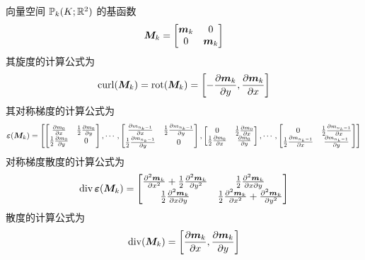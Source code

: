 \documentclass{article}
\begin{document}
向量空间 ${\mathbb P}_k(K;{\mathbb R}^2)$ 的基函数
$$
{\boldsymbol M}_k = \begin{bmatrix}
    {\boldsymbol m}_k & 0 \\ 0 & {\boldsymbol m}_k
\end{bmatrix}
$$
其旋度的计算公式为
$$
\operatorname{curl}({\boldsymbol M}_k) = \operatorname{rot}({\boldsymbol M}_k) = 
\left[
    -\frac{\partial {\boldsymbol m}_k}{\partial y}, \frac{\partial {\boldsymbol m}_k}{\partial x}
\right]
$$
其对称梯度的计算公式为
$$
{\bm \varepsilon}({\boldsymbol M}_k) = 
\left[
    \begin{bmatrix}
        {\partial m_0 \over \partial x} & 
        \frac{1}{2}{\partial m_0 \over \partial y} \\
        \frac{1}{2}{\partial m_0 \over \partial y} & 0\\
    \end{bmatrix}
    , \cdots, 
    \begin{bmatrix}
        {\partial m_{n_k-1} \over \partial x} & 
        \frac{1}{2}{\partial m_{n_k-1} \over \partial y} \\
        \frac{1}{2}{\partial m_{n_k-1} \over \partial y} & 0\\
    \end{bmatrix},
    \begin{bmatrix}
        0 & \frac{1}{2}{\partial m_0 \over \partial x} \\
        \frac{1}{2}{\partial m_0 \over \partial x} & 
        {\partial m_0 \over \partial y}\\ 
    \end{bmatrix}
    , \cdots, 
    \begin{bmatrix}
        0 & \frac{1}{2}{\partial m_{n_k-1} \over \partial x} \\
        \frac{1}{2}{\partial m_{n_k-1} \over \partial x} & 
        {\partial m_{n_k-1} \over \partial y} \\
    \end{bmatrix}
\right]
$$
对称梯度散度的计算公式为
\begin{align*}
    \operatorname{div}{\bm \varepsilon}({\boldsymbol M}_k) =
    \begin{bmatrix}
        \frac{\partial^2{\boldsymbol m}_k}{\partial x^2}+
        \frac{1}{2}\frac{\partial^2{\boldsymbol m}_k}{\partial y^2} &
        \frac{1}{2}\frac{\partial^2{\boldsymbol m}_k}{\partial x \partial y} \\
        \frac{1}{2}\frac{\partial^2{\boldsymbol m}_k}{\partial x \partial y} &
        \frac{1}{2}\frac{\partial^2{\boldsymbol m}_k}{\partial x^2} + 
        \frac{\partial^2{\boldsymbol m}_k}{\partial y^2}
    \end{bmatrix}
\end{align*}
散度的计算公式为
$$
\operatorname{div}({\boldsymbol M}_k) = \left[
    {\partial {\boldsymbol m}_k \over \partial x},
    {\partial {\boldsymbol m}_k \over \partial y} 
\right]
$$
\end{document}
